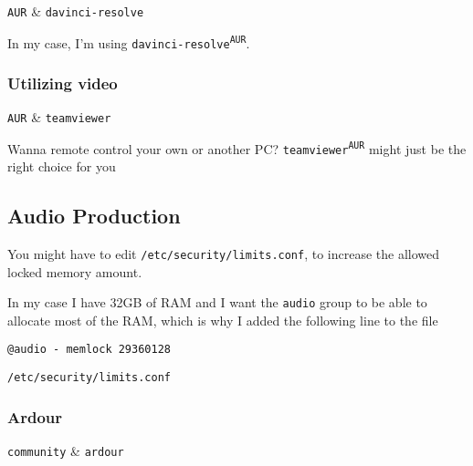 \documentclass[10pt]{dustdoc}
\begin{document}
\begin{packagetable}
    \texttt{AUR} & \texttt{davinci-resolve} \\
\end{packagetable}

In my case, I’m using \texttt{davinci-resolve\textsuperscript{\texttt{AUR}}}.

\subsubsection{Utilizing video}
\label{sec:utilizing-video}

\begin{packagetable}
    \texttt{AUR} & \texttt{teamviewer} \\
\end{packagetable}

Wanna remote control your own or another PC?
\texttt{teamviewer\textsuperscript{\texttt{AUR}}} might just be the right choice for you

\subsection{Audio Production}
\label{sec:audio-production}

You might have to edit \texttt{/etc/security/limits.conf}, to increase the allowed locked memory amount.

In my case I have 32GB of RAM and I want the \texttt{audio} group to be able to allocate most of the RAM, which is why I added the following line to the file

\begin{mintedlisting}
    \begin{verbatim}
@audio - memlock 29360128
    \end{verbatim}

    \caption{\texttt{/etc/security/limits.conf}}
\end{mintedlisting}

\subsubsection{Ardour}
\label{sec:ardour}

\begin{packagetable}
    \texttt{community} & \texttt{ardour} \\
\end{packagetable}
\end{document}
